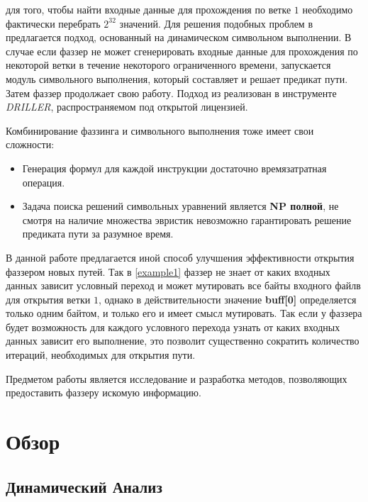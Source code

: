 для того, чтобы найти входные данные для прохождения по ветке $1$ необходимо фактически перебрать $2^32$ значений. Для решения подобных проблем в \cite{DRILLER} предлагается подход, основанный на динамическом символьном выполнении. В случае если фаззер не может сгенерировать входные данные для прохождения по некоторой ветки в течение некоторого ограниченного времени, запускается модуль символьного выполнения, который составляет и решает предикат пути. Затем фаззер продолжает свою работу.
Подход из \cite{DRILLER} реализован в инструменте \emph{DRILLER}, распространяемом под открытой лицензией.

Комбинирование фаззинга и символьного выполнения тоже имеет свои сложности:
\begin{itemize}
    \item Генерация формул для каждой инструкции достаточно времязатратная операция.
    \item Задача поиска решений символьных уравнений является \textbf{NP полной}, не смотря на наличие множества эвристик невозможно гарантировать решение предиката пути за разумное время.
\end{itemize}

В данной работе предлагается иной способ улучшения эффективности открытия фаззером новых путей. Так в \ref{example1} фаззер не знает от каких входных данных зависит условный переход и может мутировать все байты входного файлв для открытия ветки $1$, однако в действительности значение \textbf{buff[0]} определяется только одним байтом, и только его и имеет смысл мутировать.
Так если у фаззера будет возможность для каждого условного перехода узнать от каких входных данных зависит его выполнение, это позволит существенно сократить количество итераций, необходимых для открытия пути.

Предметом работы является исследование и разработка методов, позволяющих предоставить фаззеру искомую информацию.



\chapter{Обзор}


\section{Динамический Анализ}

